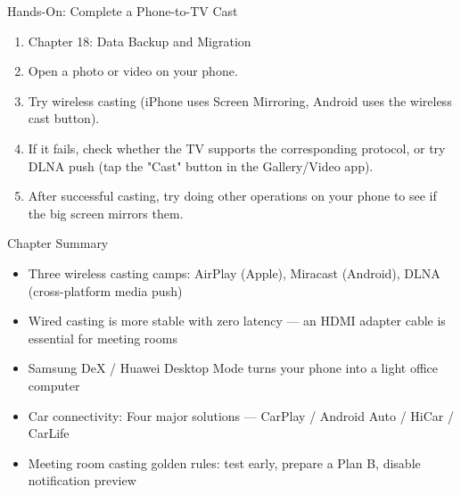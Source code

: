 \begin{tcbpractice}{Hands-On: Complete a Phone-to-TV Cast}
\begin{enumerate}
  \item Chapter 18: Data Backup and Migration
  \item Open a photo or video on your phone.
  \item Try wireless casting (iPhone uses Screen Mirroring, Android uses the wireless cast button).
  \item If it fails, check whether the TV supports the corresponding protocol, or try DLNA push (tap the "Cast" button in the Gallery/Video app).
  \item After successful casting, try doing other operations on your phone to see if the big screen mirrors them.
\end{enumerate}

\end{tcbpractice}

\begin{tcbsummary}{Chapter Summary}
\begin{itemize}
  \item Three wireless casting camps: AirPlay (Apple), Miracast (Android), DLNA (cross-platform media push)
  \item Wired casting is more stable with zero latency — an HDMI adapter cable is essential for meeting rooms
  \item Samsung DeX / Huawei Desktop Mode turns your phone into a light office computer
  \item Car connectivity: Four major solutions — CarPlay / Android Auto / HiCar / CarLife
  \item Meeting room casting golden rules: test early, prepare a Plan B, disable notification preview
\end{itemize}

\end{tcbsummary}
